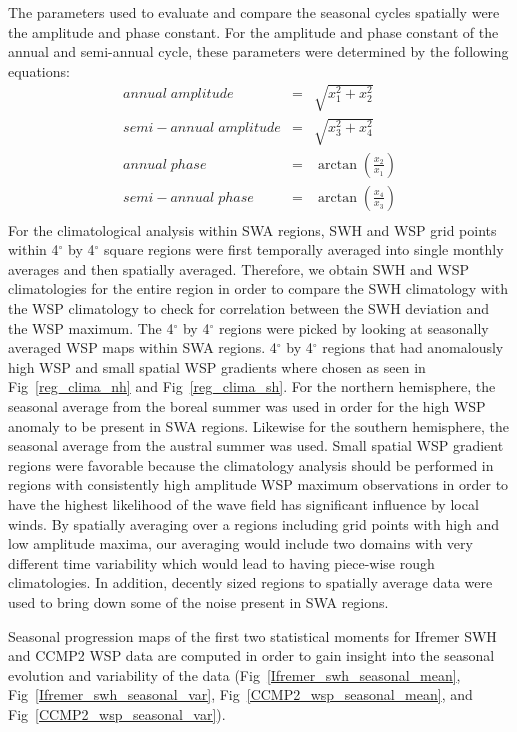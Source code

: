 \documentclass[12pt,twoside]{article}
\begin{document}
The parameters used to evaluate and compare the seasonal cycles spatially were the amplitude and phase constant. For the amplitude and phase constant of the annual and semi-annual cycle, these parameters were determined by the following equations:
 \begin{eqnarray}
     annual\;amplitude & = & \sqrt{x_1^{2} + x_2^{2}}\\
    semi-annual\;amplitude & = & \sqrt{x_3^{2} + x_4^{2}}\\
     annual\;phase & = & \arctan{\left(\frac{x_2}{x_1}\right)} \\
    semi-annual\;phase & = & \arctan{\left(\frac{x_4}{x_3}\right)}\\
 \end{eqnarray}
For the climatological analysis within SWA regions, SWH and WSP grid points within 4$^{\circ}$ by 4$^{\circ}$ square regions were first temporally averaged into single monthly averages and then spatially averaged. Therefore, we obtain SWH and WSP climatologies for the entire region in order to compare the SWH climatology with the WSP climatology to check for correlation between the SWH deviation and the WSP maximum. The 4$^{\circ}$ by 4$^{\circ}$ regions were picked by looking at seasonally averaged WSP maps within SWA regions. 4$^{\circ}$ by 4$^{\circ}$ regions that had anomalously high WSP and small spatial WSP gradients where chosen as seen in Fig~\ref{reg_clima_nh} and Fig~\ref{reg_clima_sh}. For the northern hemisphere, the seasonal average from the boreal summer was used in order for the high WSP anomaly to be present in SWA regions. Likewise for the southern hemisphere, the seasonal average from the austral summer was used. Small spatial WSP gradient regions were favorable because the climatology analysis should be performed in regions with consistently high amplitude WSP maximum observations in order to have the highest likelihood of the wave field has significant influence by local winds. By spatially averaging over a regions including grid points with high and low amplitude maxima, our averaging would include two domains with very different time variability which would lead to having piece-wise rough climatologies. In addition, decently sized regions to spatially average data were used to bring down some of the noise present in SWA regions.  


Seasonal progression maps of the first two statistical moments for Ifremer SWH and CCMP2 WSP data are computed in order to gain insight into the seasonal evolution and variability of the data (Fig~\ref{Ifremer_swh_seasonal_mean}, Fig~\ref{Ifremer_swh_seasonal_var}, Fig~\ref{CCMP2_wsp_seasonal_mean}, and Fig~\ref{CCMP2_wsp_seasonal_var}).
\end{document}
